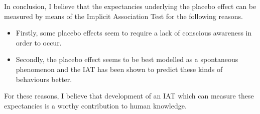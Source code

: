 In conclusion, I believe that the expectancies underlying the placebo effect can be measured by means of the Implicit Association Test for the following reasons. 
\begin{itemize}
\item Firstly, some placebo effects seem to require a lack of conscious awareness in order to occur.
\item  Secondly, the placebo effect seems to be best modelled as a spontaneous phenomenon and the IAT has been shown to predict these kinds of behaviours better.
\end{itemize}

For these reasons, I believe that  development of  an IAT which can measure these expectancies is a worthy contribution to human knowledge. 







